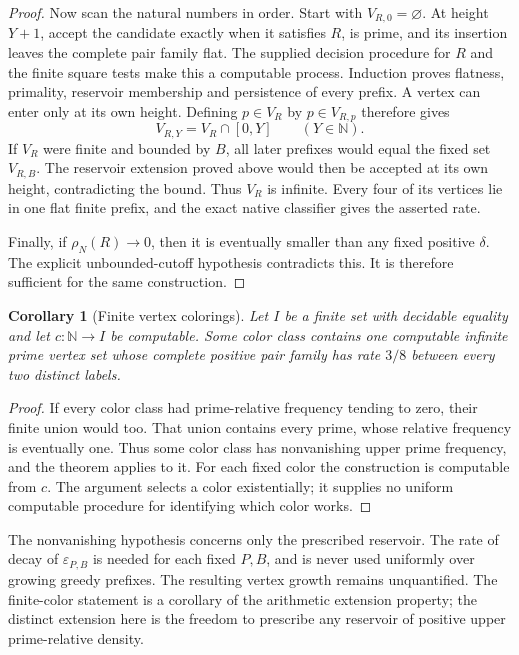 \documentclass[11pt]{article}
\newtheorem{corollary}[theorem]{Corollary}
\begin{document}
\begin{proof}
Now scan the natural numbers in order. Start with
\(V_{R,0}=\varnothing\). At height \(Y+1\), accept the candidate
exactly when it satisfies \(R\), is prime, and its insertion leaves
the complete pair family flat. The supplied decision procedure for
\(R\) and the finite square tests make this a computable process.
Induction proves flatness, primality, reservoir membership and
persistence of every prefix. A vertex can enter only at its own
height. Defining \(p\in V_R\) by \(p\in V_{R,p}\) therefore gives
\[
 V_{R,Y}=V_R\cap[0,Y]\qquad(Y\in\mathbb N).
\]
If \(V_R\) were finite and bounded by \(B\), all later prefixes
would equal the fixed set \(V_{R,B}\). The reservoir extension
proved above would then be accepted at its own height, contradicting
the bound. Thus \(V_R\) is infinite. Every four of its vertices
lie in one flat finite prefix, and the exact native classifier
gives the asserted rate.

Finally, if \(\rho_N(R)\to0\), then it is eventually smaller than
any fixed positive \(\delta\). The explicit unbounded-cutoff
hypothesis contradicts this. It is therefore sufficient for the
same construction.
\end{proof}

\begin{corollary}[Finite vertex colorings]
Let \(I\) be a finite set with decidable equality and let
\(c:\mathbb N\to I\) be computable. Some color class contains one
computable infinite prime vertex set whose complete positive pair
family has rate \(3/8\) between every two distinct labels.
\end{corollary}
\begin{proof}
If every color class had prime-relative frequency tending to zero,
their finite union would too. That union contains every prime, whose
relative frequency is eventually one. Thus some color class has
nonvanishing upper prime frequency, and the theorem applies to it.
For each fixed color the construction is computable from \(c\).
The argument selects a color existentially; it supplies no uniform
computable procedure for identifying which color works.
\end{proof}

The nonvanishing hypothesis concerns only the prescribed reservoir.
The rate of decay of \(\varepsilon_{P,B}\) is needed for each fixed
\(P,B\), and is never used uniformly over growing greedy prefixes.
The resulting vertex growth remains unquantified. The finite-color
statement is a corollary of the arithmetic extension property;
the distinct extension here is the freedom to prescribe any
reservoir of positive upper prime-relative density.
\end{document}
